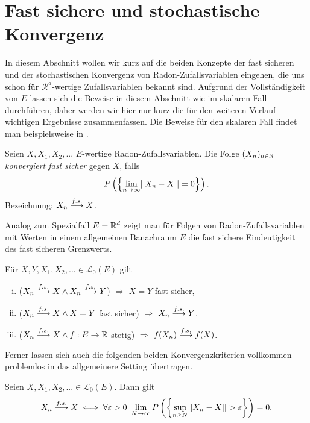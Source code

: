 \section{Fast sichere und stochastische Konvergenz}
In diesem Abschnitt wollen wir kurz auf die beiden Konzepte der fast sicheren und der stochastischen Konvergenz von Radon-Zufallsvariablen eingehen, die uns schon für $\mathcal{R}^d$-wertige Zufallsvariablen bekannt sind. 
Aufgrund der Vollständigkeit von $E$ lassen sich die Beweise in diesem Abschnitt wie im skalaren Fall durchführen, daher werden wir hier nur kurz die für den weiteren Verlauf wichtigen Ergebnisse zusammenfassen.  
Die Beweise für den skalaren Fall findet man beispielsweise in \cite{gs}. 
\begin{mydef}
    Seien $X, X_1, X_2,...$ $E$-wertige Radon-Zufallsvariablen. Die Folge $(X_n)_{n \in \mathbb{N}}$ \textit{konvergiert fast sicher} gegen $X$, falls
    $$
        P\left(\left\{ \lim_{n \to \infty} \lvert\lvert X_n - X \rvert\rvert = 0 \right\}\right).
    $$
Bezeichnung: $X_n \overset{f.s.}{\longrightarrow} X$. 
\end{mydef}

Analog zum Spezialfall $E = \mathbb{R}^d$ zeigt man für Folgen von Radon-Zufallsvariablen mit Werten in einem allgemeinen Banachraum $E$ die fast sichere Eindeutigkeit des fast sicheren Grenzwerts. 
\begin{proposition}
    Für $X,Y,X_1,X_2,... \in \mathcal{L}_0(E)$ gilt
    \begin{enumerate}[(i)]
        \item ($X_n \overset{f.s.}{\longrightarrow} X \land X_n \overset{f.s.}{\longrightarrow} Y$) $\Rightarrow$ $ X = Y$ fast sicher, 
        \item ($X_n \overset{f.s.}{\longrightarrow} X \land X = Y$ fast sicher) $\Rightarrow$ $X_n \overset{f.s.}{\longrightarrow} Y$,
        \item ($X_n \overset{f.s.}{\longrightarrow} X \land f:E \to \mathbb{R}$ stetig) $\Rightarrow$ $f(X_n) \overset{f.s.}{\longrightarrow} f(X)$. 
    \end{enumerate}
\end{proposition}

Ferner lassen sich auch die folgenden beiden Konvergenzkriterien vollkommen problemlos in das allgemeinere Setting übertragen. 

\begin{theorem}
    Seien $X, X_1,X_2,... \in \mathcal{L}_0(E)$. Dann gilt
    \begin{align*}
        X_n \overset{f.s.}{\longrightarrow} X \iff \forall \varepsilon > 0 \ \lim_{N \to \infty}P\left(\left\{ \sup_{n \geq N}\lvert\lvert X_n - X \rvert\rvert > \varepsilon \right\}\right) = 0.
    \end{align*}
\end{theorem}

